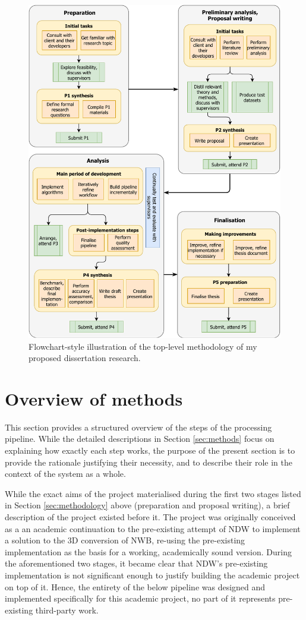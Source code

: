 \begin{figure}
    \centering
    \includegraphics[width=0.9\linewidth]{final_report/figs/methodology.pdf}
    \caption{Flowchart-style illustration of the top-level methodology of my proposed dissertation research.}
    \label{fig:methodflow}
\end{figure}

\section{Overview of methods}
\label{sec:methodsoverview}

This section provides a structured overview of the steps of the processing pipeline. While the detailed descriptions in Section \ref{sec:methods} focus on explaining how exactly each step works, the purpose of the present section is to provide the rationale justifying their necessity, and to describe their role in the context of the system as a whole.

While the exact aims of the project materialised during the first two stages listed in Section \ref{sec:methodology} above (preparation and proposal writing), a brief description of the project existed before it. The project was originally conceived as a an academic continuation to the pre-existing attempt of NDW to implement a solution to the 3D conversion of NWB, re-using the pre-existing implementation as the basis for a working, academically sound version. During the aforementioned two stages, it became clear that NDW's pre-existing implementation is not significant enough to justify building the academic project on top of it. Hence, the entirety of the below pipeline was designed and implemented specifically for this academic project, no part of it represents pre-existing third-party work.


